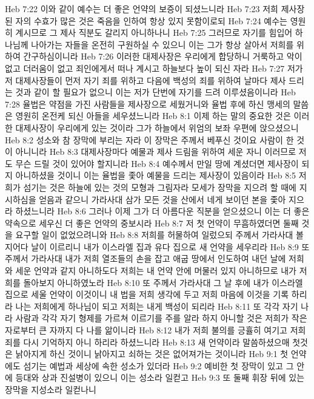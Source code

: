 Heb 7:22  이와 같이 예수는 더 좋은 언약의 보증이 되셨느니라
Heb 7:23  저희 제사장 된 자의 수효가 많은 것은 죽음을 인하여 항상 있지 못함이로되
Heb 7:24  예수는 영원히 계시므로 그 제사 직분도 갈리지 아니하나니
Heb 7:25  그러므로 자기를 힘입어 하나님께 나아가는 자들을 온전히 구원하실 수 있으니 이는 그가 항상 살아서 저희를 위하여 간구하심이니라
Heb 7:26  이러한 대제사장은 우리에게 합당하니 거룩하고 악이 없고 더러움이 없고 죄인에게서 떠나 계시고 하늘보다 높이 되신 자라
Heb 7:27  저가 저 대제사장들이 먼저 자기 죄를 위하고 다음에 백성의 죄를 위하여 날마다 제사 드리는 것과 같이 할 필요가 없으니 이는 저가 단번에 자기를 드려 이루셨음이니라
Heb 7:28  율법은 약점을 가진 사람들을 제사장으로 세웠거니와 율법 후에 하신 맹세의 말씀은 영원히 온전케 되신 아들을 세우셨느니라
Heb 8:1  이제 하는 말의 중요한 것은 이러한 대제사장이 우리에게 있는 것이라 그가 하늘에서 위엄의 보좌 우편에 앉으셨으니
Heb 8:2  성소와 참 장막에 부리는 자라 이 장막은 주께서 베푸신 것이요 사람이 한 것이 아니니라
Heb 8:3  대제사장마다 예물과 제사 드림을 위하여 세운 자니 이러므로 저도 무슨 드릴 것이 있어야 할지니라
Heb 8:4  예수께서 만일 땅에 계셨더면 제사장이 되지 아니하셨을 것이니 이는 율법을 좇아 예물을 드리는 제사장이 있음이라
Heb 8:5  저희가 섬기는 것은 하늘에 있는 것의 모형과 그림자라 모세가 장막을 지으려 할 때에 지시하심을 얻음과 같으니 가라사대 삼가 모든 것을 산에서 네게 보이던 본을 좇아 지으라 하셨느니라
Heb 8:6  그러나 이제 그가 더 아름다운 직분을 얻으셨으니 이는 더 좋은 약속으로 세우신 더 좋은 언약의 중보시라
Heb 8:7  저 첫 언약이 무흠하였더면 둘째 것을 요구할 일이 없었으려니와
Heb 8:8  저희를 허물하여 일렀으되 주께서 가라사대 볼지어다 날이 이르리니 내가 이스라엘 집과 유다 집으로 새 언약을 세우리라
Heb 8:9  또 주께서 가라사대 내가 저희 열조들의 손을 잡고 애굽 땅에서 인도하여 내던 날에 저희와 세운 언약과 같지 아니하도다 저희는 내 언약 안에 머물러 있지 아니하므로 내가 저희를 돌아보지 아니하였노라
Heb 8:10  또 주께서 가라사대 그 날 후에 내가 이스라엘 집으로 세울 언약이 이것이니 내 법을 저희 생각에 두고 저희 마음에 이것을 기록 하리라 나는 저희에게 하나님이 되고 저희는 내게 백성이 되리라
Heb 8:11  또 각각 자기 나라 사람과 각각 자기 형제를 가르쳐 이르기를 주를 알라 하지 아니할 것은 저희가 작은 자로부터 큰 자까지 다 나를 앎이니라
Heb 8:12  내가 저희 불의를 긍휼히 여기고 저희 죄를 다시 기억하지 아니 하리라 하셨느니라
Heb 8:13  새 언약이라 말씀하셨으매 첫것은 낡아지게 하신 것이니 낡아지고 쇠하는 것은 없어져가는 것이니라
Heb 9:1  첫 언약에도 섬기는 예법과 세상에 속한 성소가 있더라
Heb 9:2  예비한 첫 장막이 있고 그 안에 등대와 상과 진설병이 있으니 이는 성소라 일컫고
Heb 9:3  또 둘째 휘장 뒤에 있는 장막을 지성소라 일컫나니
